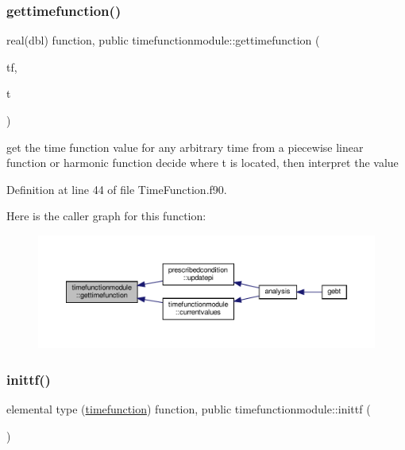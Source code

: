 \subsubsection{\texorpdfstring{gettimefunction()}{gettimefunction()}}
{\footnotesize\ttfamily real(dbl) function, public timefunctionmodule\+::gettimefunction (\begin{DoxyParamCaption}\item[{type (\hyperlink{structtimefunctionmodule_1_1timefunction}{timefunction}), intent(in)}]{tf,  }\item[{real(dbl), intent(in)}]{t }\end{DoxyParamCaption})}



get the time function value for any arbitrary time from a piecewise linear function or harmonic function decide where t is located, then interpret the value 



Definition at line 44 of file Time\+Function.\+f90.

Here is the caller graph for this function\+:\nopagebreak
\begin{figure}[H]
\begin{center}
\leavevmode
\includegraphics[width=350pt]{namespacetimefunctionmodule_a177d2096c59b79cbbfd85b4e05b57f29_icgraph}
\end{center}
\end{figure}
\mbox{\label{namespacetimefunctionmodule_a4a9a0cfa8fd5fc6dcfd21c0eeed2a027}} 
\subsubsection{\texorpdfstring{inittf()}{inittf()}}
{\footnotesize\ttfamily elemental type (\hyperlink{structtimefunctionmodule_1_1timefunction}{timefunction}) function, public timefunctionmodule\+::inittf (\begin{DoxyParamCaption}{ }\end{DoxyParamCaption})}




